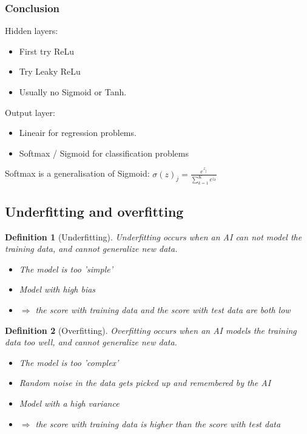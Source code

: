 \documentclass{article}
\newtheorem{theorem}{Definition}[section]
\begin{document}
\subsubsection{Conclusion}

Hidden layers:

\begin{itemize}
    \item First try ReLu
    \item Try Leaky ReLu
    \item Usually no Sigmoid or Tanh.
\end{itemize}


Output layer:
\begin{itemize}
    \item Lineair for regression problems.
    \item Softmax / Sigmoid for classification problems
\end{itemize}


Softmax is a generalisation of Sigmoid: $\sigma(z)_j = \frac{e^{z_j}}{\sum_{k=1}^K e^{z_k}}$

\subsection{Underfitting and overfitting}


\begin{theorem}[Underfitting]
    Underfitting occurs when an AI can not model the training data, and cannot generalize new data.
    
    \begin{itemize}
        \item The model is too 'simple'
        \item Model with high bias
        \item $\Rightarrow$ the score with training data and the score with test data are both low
    \end{itemize}
\end{theorem}

\begin{theorem}[Overfitting]
    Overfitting occurs when an AI models the training data too well, and cannot generalize new data.
    
    \begin{itemize}
        \item The model is too 'complex'
        \item Random noise in the data gets picked up and remembered by the AI
        \item Model with a high variance
        \item $\Rightarrow$ the score with training data is higher than the score with test data
    \end{itemize}
\end{theorem}
\end{document}
